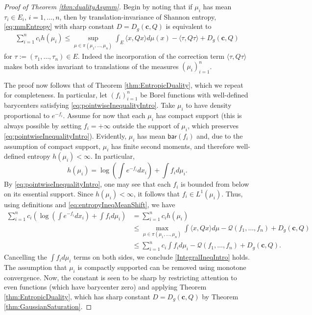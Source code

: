 \documentclass[10pt]{article}
\newcommand{\bary}{\mathsf{bar}}
\begin{document}
\begin{proof}[Proof of Theorem \ref{thm:dualityAsymm}]
Begin by noting that if $\mu_i$ has mean $\tau_i \in E_i$, $i=1, \dots, n$, then by translation-invariance of Shannon entropy, \eqref{eq:mmEntropy} with sharp constant $D = D_g(\mathbf{c},Q)$ is equivalent to 
\begin{align}
  \sum_{i=1}^n c_i h(\mu_i) \leq \sup_{\mu \in \pi(\mu_1, \dots, \mu_n)}  \int_E \langle x, Q x\rangle d\mu(x)  - \langle \tau, Q \tau\rangle + D_g(\mathbf{c},Q) \label{eq:entropyIneqMeanShift}
\end{align}
for $\tau := (\tau_1, \dots, \tau_n) \in E$.  Indeed the incorporation of the correction term $\langle \tau, Q \tau\rangle$ makes both sides invariant to translations of the measures $(\mu_i)_{i=1}^n$.  

The proof now follows that of Theorem \ref{thm:EntropicDuality}, which we repeat for completeness.  In particular,   let $(f_i)_{i=1}^n$ be Borel functions with well-defined barycenters satisfying \eqref{eq:pointwiseInequalityIntro}.  Take  $\mu_i$ to have density proportional to $e^{-{f_i}} $. Assume for now that each $\mu_i$ has compact support (this is always possible by setting $f_i = +\infty$ outside the support of $\mu_i$, which preserves \eqref{eq:pointwiseInequalityIntro}).  Evidently, $\mu_i$ has mean $\bary(f_i)$ and, due to the assumption of compact support, $\mu_i$ has finite second moments, and therefore well-defined entropy $h(\mu_i) < \infty$.    In particular, 
$$
h(\mu_i) =   \log \left( \int e^{-f_i} d x_i \right)  + \int  f_i d\mu_i.
$$
By \eqref{eq:pointwiseInequalityIntro}, one may see that each $f_i$ is bounded from below on its essential support.  Since $h(\mu_i)<\infty$,   it follows that $f_i  \in L^1(\mu_i)$. 
 Thus, using definitions and \eqref{eq:entropyIneqMeanShift}, we have 
\begin{align*}
\sum_{i=1}^n c_i \left( \log \left( \int e^{-f_i} d x_i \right)  + \int  f_i d\mu_i  \right)&=  \sum_{i=1}^n c_i h(\mu_i) \\
&\leq  \max_{\mu \in \pi(\mu_1, \dots, \mu_n)} \int \langle x, Q x\rangle d\mu - \mathcal{Q}(f_1,\dots, f_n) +D_g(\mathbf{c},Q)\\
&\leq   \sum_{i=1}^nc_i \int f_i  d\mu_i - \mathcal{Q}(f_1,\dots, f_n) +D_g(\mathbf{c},Q).
\end{align*}
Cancelling the $\int f_i  d\mu_i$ terms on both sides, we conclude \eqref{IntegralIneqIntro} holds.  The assumption that $\mu_i$ is compactly supported can be removed using monotone convergence.  Now, the constant is seen to be sharp by restricting attention to even functions (which have barycenter zero) and applying Theorem \ref{thm:EntropicDuality}, which has sharp constant $D = D_g(\mathbf{c},Q)$ by Theorem \ref{thm:GaussianSaturation}.
\end{proof}
\end{document}
